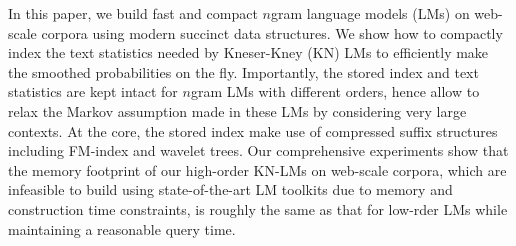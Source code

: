 In this paper, we build  fast and compact $n$gram language models (LMs)  on web-scale corpora using modern succinct data structures.
%
We show how to compactly index the text statistics needed by Kneser-Kney (KN) LMs 
to efficiently make the smoothed probabilities on the fly.
%
Importantly, the stored index and text statistics are kept intact for $n$gram LMs with different orders, 
hence allow to relax the Markov assumption made in these LMs by considering very large contexts.
%
At the core, the stored index make use of compressed suffix structures including FM-index and wavelet trees.
%
Our comprehensive experiments show that the memory footprint of our high-order KN-LMs on web-scale corpora, which are infeasible to build using 
state-of-the-art LM toolkits due to memory and construction time constraints, is roughly the same as that for low-rder LMs while maintaining 
a reasonable query time. 
